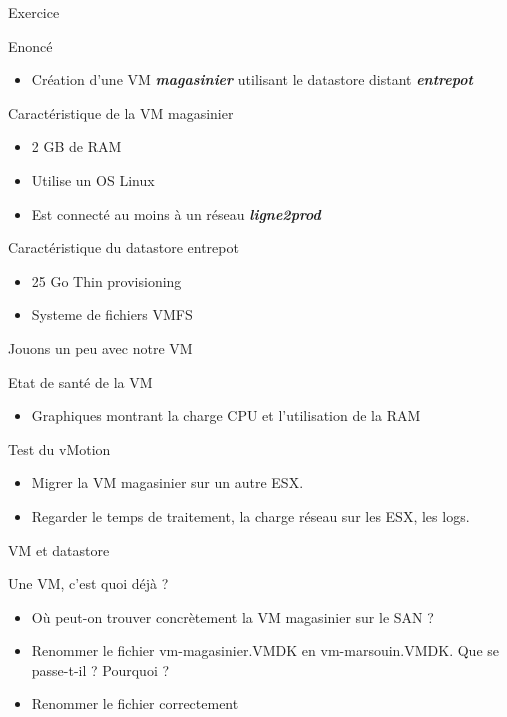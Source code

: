 \begin{frame}{Exercice}
\begin{block}{Enoncé}
\begin{itemize}
\item Création d'une VM \textit{\textbf{magasinier}} utilisant le datastore distant \textbf{\textit{entrepot}}
\end{itemize}
\end{block}
\begin{block}{Caractéristique de la VM magasinier}
\begin{itemize}
\item 2 GB de RAM
\item Utilise un OS Linux
\item Est connecté au moins à un réseau \textbf{\textit{ligne2prod}}
\end{itemize}
\end{block}
\begin{block}{Caractéristique du datastore entrepot}
\begin{itemize}
\item 25 Go Thin provisioning
\item Systeme de fichiers VMFS
\end{itemize}
\end{block}
\end{frame}

\begin{frame}{Jouons un peu avec notre VM}
\begin{block}{Etat de santé de la VM}
\begin{itemize}
\item Graphiques montrant la charge CPU et l'utilisation de la RAM
\end{itemize}
\end{block}
\begin{block}{Test du vMotion}
\begin{itemize}
\item Migrer la VM magasinier sur un autre ESX. 
\item Regarder le temps de traitement, la charge réseau sur les ESX, les logs.
\end{itemize}
\end{block}
\end{frame}

\begin{frame}{VM et datastore}
\begin{block}{Une VM, c'est quoi déjà ?}
\begin{itemize}
\item Où peut-on trouver concrètement la VM magasinier sur le SAN ? 
\item Renommer le fichier vm-magasinier.VMDK en vm-marsouin.VMDK. Que se passe-t-il ? Pourquoi ? 
\item Renommer le fichier correctement
\end{itemize}
\end{block}
\end{frame}

